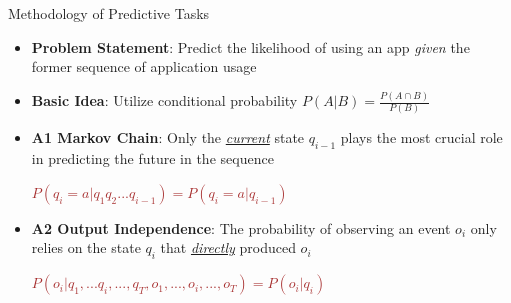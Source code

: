\documentclass[final]{beamer}
\newlength{\colwidth}
\begin{document}
\begin{frame}[t]
\begin{columns}[t]
\begin{column}{\colwidth}
\begin{exampleblock}{\huge{Methodology of Predictive Tasks}}
        {
          \fontsize{37pt}{44.4pt} \selectfont {}

          \begin{itemize}
            \item \textbf{Problem Statement}: Predict the likelihood of using an app \textit{given} the former sequence of application usage
            \item \textbf{Basic Idea}: Utilize conditional probability $P(A|B) = \frac{P(A\cap B)}{P(B)}$

            \item \textbf{A1 Markov Chain}: Only the \underline{\textit{current}} state $q_{i-1}$ plays the most crucial role in predicting the future in the sequence \\
                  {\centering \textcolor{brown}{$P(q_i = a | q_1q_2...q_{i-1}) = P(q_i= a | q_{i-1})$} \par}

            \item \textbf{A2 Output Independence}: The probability of observing an event $o_i$ only relies on the state $q_i$ that \underline{\textit{directly}} produced $o_i$
\\
                    {\centering \textcolor{brown}{$P(o_i | q_1, ... q_i , ..., q_T, o_1, ..., o_i, ..., o_T) = P(o_i | q_i)$} \par}
                    

\end{itemize}}
\end{exampleblock}
\end{column}
\end{columns}
\end{frame}
\end{document}
